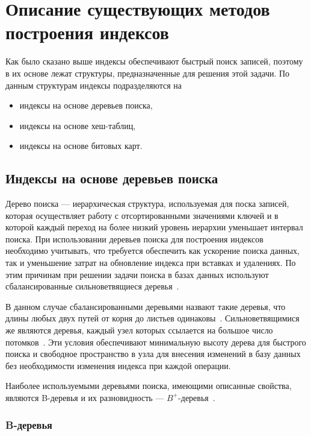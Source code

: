 \chapter{Описание существующих методов построения индексов\label{methods}}

Как было сказано выше индексы обеспечивают быстрый поиск записей, поэтому в их
основе лежат структуры, предназначенные для решения этой задачи. По данным
структурам индексы подразделяются на
\begin{itemize}
    \item индексы на основе деревьев поиска,
    \item индексы на основе хеш-таблиц,
    \item индексы на основе битовых карт.
\end{itemize}

\section{Индексы на основе деревьев поиска}

Дерево поиска --- иерархическая структура, используемая для поска записей,
которая осуществляет работу с отсортированными значениями ключей и в которой
каждый переход на более низкий уровень иерархии уменьшает интервал поиска. При
использовании деревьев поиска для построения индексов необходимо учитывать, что
требуется обеспечить как ускорение поиска данных, так и уменьшение затрат на
обновление индекса при вставках и удалениях. По этим причинам при решении задачи
поиска в базах данных используют сбалансированные сильноветвящиеся
деревья~\cite{arki}.

В данном случае сбалансированными деревьями назвают такие деревья, что длины
любых двух путей от корня до листьев одинаковы~\cite{encycl}. Сильноветвящимися
же являются деревья, каждый узел которых ссылается на большое число
потомков~\cite{squares}.  Эти условия обеспечивают минимальную высоту дерева для
быстрого поиска и свободное пространство в узла для внесения изменений в базу
данных без необходимости изменения индекса при каждой операции.

Наиболее используемыми деревьями поиска, имеющими описанные свойства, являются
B-деревья и их разновидность --- $B^+$-деревья~\cite{arki}.

\subsection{B-деревья}

